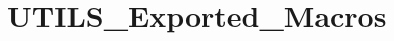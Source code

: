 \hypertarget{group___u_t_i_l_s___exported___macros}{}\section{U\+T\+I\+L\+S\+\_\+\+Exported\+\_\+\+Macros}
\label{group___u_t_i_l_s___exported___macros}
